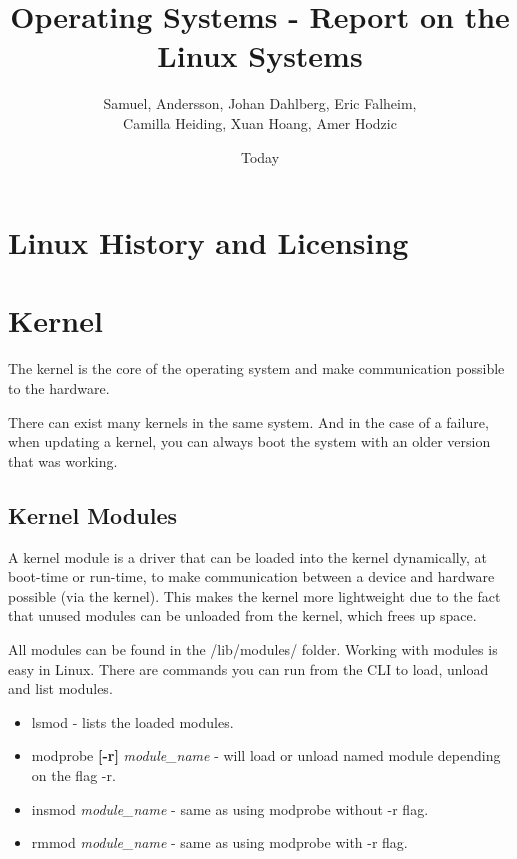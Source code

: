 \documentclass[12pt]{article}
\begin{document}
\title{Operating Systems - Report on the Linux Systems}
\author{Samuel, Andersson, Johan Dahlberg, Eric Falheim, \\Camilla Heiding, Xuan Hoang, Amer Hodzic}
\date{Today}
\maketitle

\newpage
\tableofcontents
\newpage

\section{Linux History and Licensing} %


\section{Kernel}
The kernel is the core of the operating system and make communication possible to the hardware.

There can exist many kernels in the same system. And in the case of a failure, when updating a kernel,
you can always boot the system with an older version that was working.

\subsection{Kernel Modules} %
A kernel module is a driver that can be loaded into the kernel dynamically, at boot-time or run-time,
to make communication between a device and hardware possible (via the kernel).
This makes the kernel more lightweight due to the fact that unused modules can be unloaded from the kernel, which frees up space.

All modules can be found in the /lib/modules/ folder.
Working with modules is easy in Linux. There are commands you can run from the CLI to load, unload and list modules.
\begin{itemize}
  \item lsmod - lists the loaded modules.
  \item modprobe \textbf{[-r]} \textit{module\_name} - will load or unload named module depending on the flag -r.
  \item insmod \textit{module\_name} - same as using modprobe without -r flag.
  \item rmmod \textit{module\_name} - same as using modprobe with -r flag.
\end{itemize}
\end{document}
